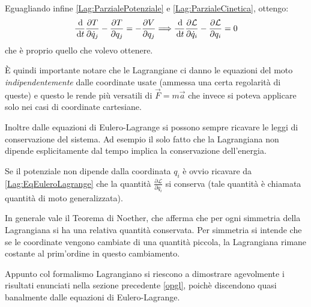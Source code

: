 \documentclass[../main.tex]{subfiles}
\begin{document}
Eguagliando infine \cref{Lag:ParzialePotenziale} e \cref{Lag:ParzialeCinetica}, ottengo:
\begin{equation*}
	\frac{\,\mathrm{d}}{\,\mathrm{d} t}\frac{\partial T}{\partial \dot q_j} - \frac{\partial T}{\partial q_j}=-\frac{\partial V}{\partial q_j} \Longrightarrow \frac{\,\mathrm{d}}{\,\mathrm{d} t} \frac{\partial \mathcal L}{\partial \dot q_i} - \frac{\partial \mathcal L}{\partial q_i}=0
\end{equation*}
che è proprio quello che volevo ottenere.

È quindi importante notare che le Lagrangiane ci danno le equazioni del moto \emph{indipendentemente} dalle coordinate usate (ammessa una certa regolarità di queste) e questo le rende più versatili di $\vec F=m\vec a$ che invece si poteva applicare solo nei casi di coordinate cartesiane.

Inoltre dalle equazioni di Eulero-Lagrange si possono sempre ricavare le leggi di conservazione del sistema. Ad esempio il solo fatto che la Lagrangiana non dipende esplicitamente dal tempo implica la conservazione dell'energia.

Se il potenziale non dipende dalla coordinata $q_i$ è ovvio ricavare da \cref{Lag:EqEuleroLagrange} che la quantità $\frac{\partial \mathcal L}{\partial \dot q_i}$ si conserva (tale quantità è chiamata quantità di moto generalizzata).

In generale vale il Teorema di Noether, che afferma che per ogni simmetria della Lagrangiana si ha una relativa quantità conservata. Per simmetria si intende che se le coordinate vengono cambiate di una quantità piccola, la Lagrangiana rimane costante al prim'ordine in questo cambiamento.

Appunto col formalismo Lagrangiano si riescono a dimostrare agevolmente i risultati enunciati nella sezione precedente \cref{opgl}, poichè discendono quasi banalmente dalle equazioni di Eulero-Lagrange.
\end{document}
